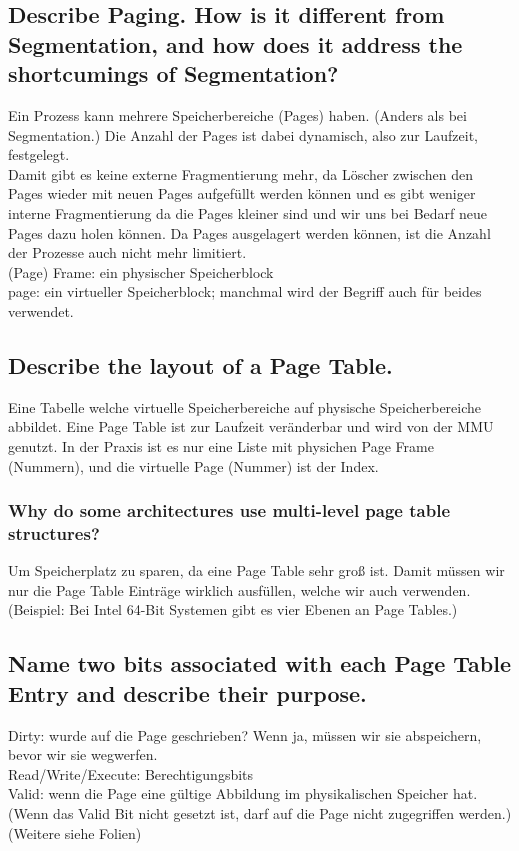 \subsection{Describe Paging. How is it different from Segmentation, and how does it address the shortcumings of Segmentation?}
Ein Prozess kann mehrere Speicherbereiche (Pages) haben.
(Anders als bei Segmentation.)
Die Anzahl der Pages ist dabei dynamisch, also zur Laufzeit, festgelegt.\\
Damit gibt es keine externe Fragmentierung mehr, da Löscher zwischen den Pages wieder mit neuen Pages aufgefüllt werden können und es gibt weniger interne Fragmentierung da die Pages kleiner sind und wir uns bei Bedarf neue Pages dazu holen können.
Da Pages ausgelagert werden können, ist die Anzahl der Prozesse auch nicht mehr limitiert.\\
(Page) Frame: ein physischer Speicherblock\\
page: ein virtueller Speicherblock; manchmal wird der Begriff auch für beides verwendet.

\subsection{Describe the layout of a Page Table.}
Eine Tabelle welche virtuelle Speicherbereiche auf physische Speicherbereiche abbildet.
Eine Page Table ist zur Laufzeit veränderbar und wird von der MMU genutzt.
In der Praxis ist es nur eine Liste mit physichen Page Frame (Nummern), und die virtuelle Page (Nummer) ist der Index.

\subsubsection{Why do some architectures use multi-level page table structures?}
Um Speicherplatz zu sparen, da eine Page Table sehr groß ist. Damit müssen wir nur die Page Table Einträge wirklich ausfüllen, welche wir auch verwenden.
(Beispiel: Bei Intel 64-Bit Systemen gibt es vier Ebenen an Page Tables.)

\subsection{Name two bits associated with each Page Table Entry and describe their purpose.}
Dirty: wurde auf die Page geschrieben? Wenn ja, müssen wir sie abspeichern, bevor wir sie wegwerfen.\\
Read/Write/Execute: Berechtigungsbits\\
Valid: wenn die Page eine gültige Abbildung im physikalischen Speicher hat. (Wenn das Valid Bit nicht gesetzt ist, darf auf die Page nicht zugegriffen werden.)\\
(\todo Weitere siehe Folien)

